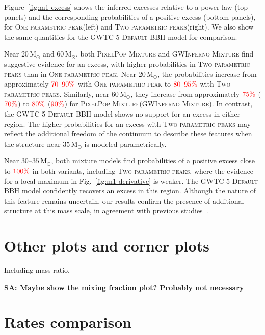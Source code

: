 \documentclass[twocolumn,twocolappendix,linenumbers]{aastex631}
\newcommand{\sa}[1]{{\bf\color{Thistle}SA: #1}}
\newcommand{\PPMixture}{\textsc{PixelPop Mixture}\xspace}
\newcommand{\GwinfMixture}{\textsc{GWInferno Mixture}\xspace}
\newcommand{\oneparpeak}{\textsc{One parametric peak}\xspace}
\newcommand{\twoparpeaks}{\textsc{Two parametric peaks}\xspace}
\newcommand{\Msun}{\ensuremath{\mathrm{M}_\odot}\xspace}
\begin{document}
Figure~\ref{fig:m1-excess} shows the inferred excesses relative to a power law (top panels) and the corresponding probabilities of a positive excess (bottom panels), for \oneparpeak (left) and \twoparpeaks (right). We also show the same quantities for the \ac{GWTC-5} \textsc{Default} \ac{BBH} model for comparison.

Near $20\,\Msun$ and $60\,\Msun$, both \PPMixture and \GwinfMixture find suggestive evidence for an excess, with higher probabilities in \twoparpeaks than in \oneparpeak. Near $20\,\Msun$, the probabilities increase from approximately $\textcolor{red}{70\text{--}90\%}$ with \oneparpeak to $\textcolor{red}{80\text{--}95\%}$ with \twoparpeaks. Similarly, near $60\,\Msun$, they increase from approximately $\textcolor{red}{75\%}$ ($\textcolor{red}{70\%}$) to $\textcolor{red}{80\%}$ ($\textcolor{red}{90\%}$) for \PPMixture (\GwinfMixture). In contrast, the \ac{GWTC-5} \textsc{Default} \ac{BBH} model shows no support for an excess in either region. The higher probabilities for an excess with \twoparpeaks may reflect the additional freedom of the continuum to describe these features when the structure near $35\,\Msun$ is modeled parametrically. 

Near $30$--$35\,\Msun$, both mixture models find probabilities of a positive excess close to $\textcolor{red}{100\%}$ in both variants, including \twoparpeaks, where the evidence for a local maximum in Fig.~\ref{fig:m1-derivative} is weaker. The \ac{GWTC-5} \textsc{Default} \ac{BBH} model confidently recovers an excess in this region. Although the nature of this feature remains uncertain, our results confirm the presence of additional structure at this mass scale, in agreement with previous studies~\citep[e.g.,][]{Talbot:2018cva, LIGOScientific:2018jsj, LIGOScientific:2020kqk, KAGRA:2021duu, Farah:2023vsc,Roy:2025ktr, Sridhar:2025kvi,LIGOScientific:2026ctl,Ray:2026uur}.

\section{Other plots and corner plots}

Including mass ratio.

\sa{Maybe show the mixing fraction plot? Probably not necessary}

\section{Rates comparison}\label{app:rates}
\end{document}
